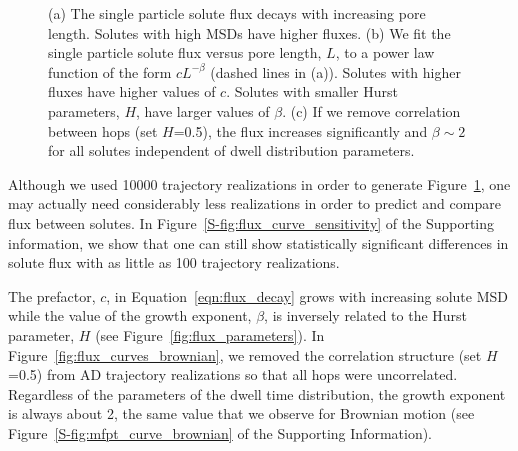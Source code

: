 \documentclass{article}
\begin{document}
\begin{figure}
  \caption{(a) The single particle solute flux decays with increasing pore length. 
  Solutes with high MSDs have higher fluxes. (b) We fit the single particle solute flux 
  versus pore length, $L$, to a power law function of the form $cL^{-\beta}$ (dashed 
  lines in (a)). Solutes with higher fluxes have higher values of $c$. Solutes with 
  smaller Hurst parameters, $H$, have larger values of $\beta$. (c) If we remove 
  correlation between hops (set $H$=0.5), the flux increases significantly and 
  $\beta \sim 2$ for all solutes independent of dwell distribution
  parameters.}\label{fig:flux_curves}
  \end{figure}
  
  Although we used 10000 trajectory realizations in order to generate 
  Figure~\ref{fig:flux_curves}, one may actually need considerably less realizations
  in order to predict and compare flux between solutes. In Figure~\ref{S-fig:flux_curve_sensitivity}
  of the Supporting information, we show that one can still show statistically
  significant differences in solute flux with as little as 100 trajectory 
  realizations.
  
  The prefactor, $c$, in Equation~\ref{eqn:flux_decay} grows with increasing
  solute MSD while the value of the growth exponent, $\beta$, is inversely 
  related to the Hurst parameter, $H$ (see Figure~\ref{fig:flux_parameters}).
  In Figure~\ref{fig:flux_curves_brownian}, we removed the correlation 
  structure (set $H$=0.5) from AD trajectory realizations so that all hops 
  were uncorrelated. Regardless of the parameters of the dwell time distribution,
  the growth exponent is always about 2, the same value that we observe for 
  Brownian motion (see Figure~\ref{S-fig:mfpt_curve_brownian} of the 
  Supporting Information). 
\end{document}
